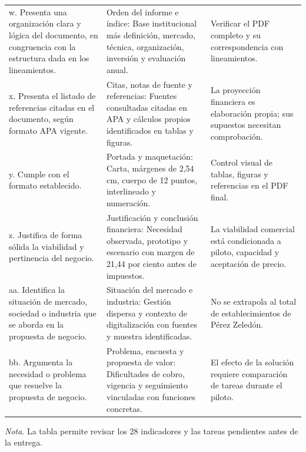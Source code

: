 \begin{longtable}{p{4.0cm}p{5.6cm}p{4.2cm}}
w. Presenta una organización clara y lógica del documento, en congruencia con la estructura dada en los lineamientos. & Orden del informe e índice: Base institucional más definición, mercado, técnica, organización, inversión y evaluación anual. & Verificar el PDF completo y su correspondencia con lineamientos. \\
x. Presenta el listado de referencias citadas en el documento, según formato APA vigente. & Citas, notas de fuente y referencias: Fuentes consultadas citadas en APA y cálculos propios identificados en tablas y figuras. & La proyección financiera es elaboración propia; sus supuestos necesitan comprobación. \\
y. Cumple con el formato establecido. & Portada y maquetación: Carta, márgenes de 2,54 cm, cuerpo de 12 puntos, interlineado y numeración. & Control visual de tablas, figuras y referencias en el PDF final. \\
z. Justifica de forma sólida la viabilidad y pertinencia del negocio. & Justificación y conclusión financiera: Necesidad observada, prototipo y escenario con margen de 21,44 por ciento antes de impuestos. & La viabilidad comercial está condicionada a piloto, capacidad y aceptación de precio. \\
aa. Identifica la situación de mercado, sociedad o industria que se aborda en la propuesta de negocio. & Situación del mercado e industria: Gestión dispersa y contexto de digitalización con fuentes y muestra identificadas. & No se extrapola al total de establecimientos de Pérez Zeledón. \\
bb. Argumenta la necesidad o problema que resuelve la propuesta de negocio. & Problema, encuesta y propuesta de valor: Dificultades de cobro, vigencia y seguimiento vinculadas con funciones concretas. & El efecto de la solución requiere comparación de tareas durante el piloto. \\
\bottomrule
\end{longtable}
\textit{Nota}. La tabla permite revisar los 28 indicadores y las tareas pendientes antes de la entrega.
